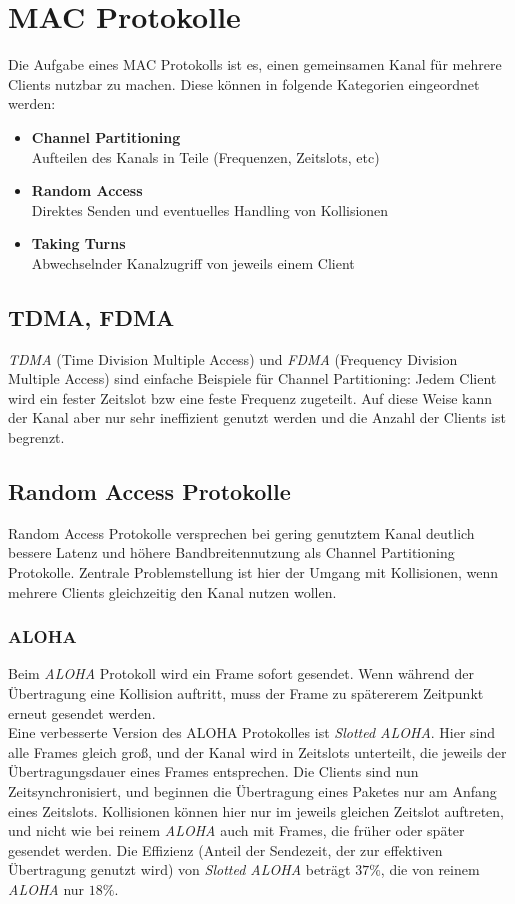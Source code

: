 \section{MAC Protokolle}
Die Aufgabe eines MAC Protokolls ist es, einen gemeinsamen Kanal für mehrere Clients nutzbar zu machen. Diese können in folgende Kategorien eingeordnet werden:
\begin{itemize}
    \item \textbf{Channel Partitioning}\\
        Aufteilen des Kanals in Teile (Frequenzen, Zeitslots, etc)
    \item \textbf{Random Access}\\
        Direktes Senden und eventuelles Handling von Kollisionen
    \item \textbf{Taking Turns}\\
        Abwechselnder Kanalzugriff von jeweils einem Client
\end{itemize}

\subsection{TDMA, FDMA}
\emph{TDMA} (Time Division Multiple Access) und \emph{FDMA} (Frequency Division Multiple Access) sind einfache Beispiele für Channel Partitioning: Jedem Client wird ein fester Zeitslot bzw eine feste Frequenz zugeteilt. Auf diese Weise kann der Kanal aber nur sehr ineffizient genutzt werden und die Anzahl der Clients ist begrenzt.

\subsection{Random Access Protokolle}
Random Access Protokolle versprechen bei gering genutztem Kanal deutlich bessere Latenz und höhere Bandbreitennutzung als Channel Partitioning Protokolle. Zentrale Problemstellung ist hier der Umgang mit Kollisionen, wenn mehrere Clients gleichzeitig den Kanal nutzen wollen.

\subsubsection{ALOHA}
Beim \emph{ALOHA} Protokoll wird ein Frame sofort gesendet. Wenn während der Übertragung eine Kollision auftritt, muss der Frame zu spätererem Zeitpunkt erneut gesendet werden. \\
Eine verbesserte Version des ALOHA Protokolles ist \emph{Slotted ALOHA}. Hier sind alle Frames gleich groß, und der Kanal wird in Zeitslots unterteilt, die jeweils der Übertragungsdauer eines Frames entsprechen. Die Clients sind nun Zeitsynchronisiert, und beginnen die Übertragung eines Paketes nur am Anfang eines Zeitslots. Kollisionen können hier nur im jeweils gleichen Zeitslot auftreten, und nicht wie bei reinem \emph{ALOHA} auch mit Frames, die früher oder später gesendet werden. Die Effizienz (Anteil der Sendezeit, der zur effektiven Übertragung genutzt wird) von \emph{Slotted ALOHA} beträgt $37\%$, die von reinem \emph{ALOHA} nur $18\%$.

